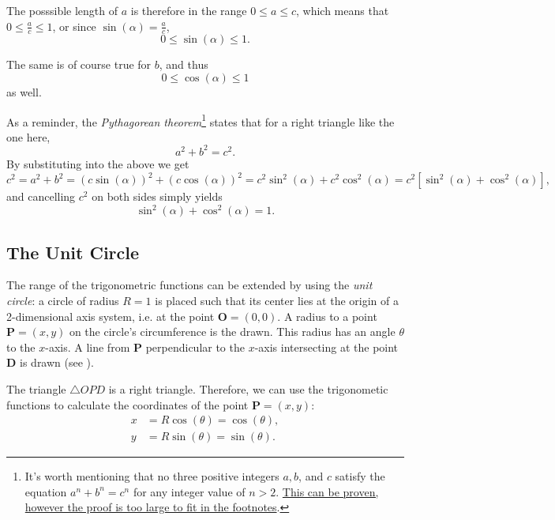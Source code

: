 The posssible length of $a$ is therefore in the range $0\leq a \leq c$, which means that $0\leq \frac{a}{c} \leq 1$, or since $\sin(\alpha)=\frac{a}{c}$,
\begin{equation}
	0\leq \sin(\alpha) \leq1.
	\label{eq:img_sin}
\end{equation}

The same is of course true for $b$, and thus
\begin{equation}
	0\leq \cos(\alpha) \leq1
	\label{eq:img_cos}
\end{equation}
as well.

As a reminder, the \emph{Pythagorean theorem}\footnote{It's worth mentioning that no three positive integers $a, b$, and $c$ satisfy the equation $a^{n}+b^{n}=c^{n}$ for any integer value of $n>2$. \href{https://en.wikipedia.org/wiki/Fermat\%27s_Last_Theorem}{This can be proven, however the proof is too large to fit in the footnotes}.} states that for a right triangle like the one here,
\begin{equation}
	a^{2} + b^{2} = c^{2}.
	\label{eq:pythagorean_theorem}
\end{equation}
By substituting  into the above we get
\begin{equation*}
	c^{2} = a^{2}+b^{2} = \left( c\sin(\alpha) \right)^{2} + \left( c\cos(\alpha) \right)^{2} = c^{2}\sin^{2}(\alpha) + c^{2}\cos^{2}(\alpha) = c^{2}\left[ \sin^{2}(\alpha) + \cos^{2}(\alpha) \right],
\end{equation*}
and cancelling $c^{2}$ on both sides simply yields
\begin{equation}
	\sin^{2}(\alpha) + \cos^{2}(\alpha) = 1.
	\label{eq:sin2_cos2_1}
\end{equation}

\subsection{The Unit Circle}
The range of the trigonometric functions can be extended by using the \emph{unit circle}: a circle of radius $R=1$ is placed such that its center lies at the origin of a 2-dimensional axis system, i.e. at the point $\bm{O}=(0,0)$. A radius to a point $\bm{P}=(x,y)$ on the circle's circumference is the drawn. This radius has an angle $\theta$ to the $x$-axis. A line from $\bm{P}$ perpendicular to the $x$-axis intersecting at the point $\bm{D}$ is drawn (see ).

The triangle $\triangle OPD$ is a right triangle. Therefore, we can use the trigonometic functions to calculate the coordinates of the point $\bm{P}=(x,y)$:
\begin{align}
	x &= R\cos(\theta) = \cos(\theta),\nonumber\\
	y &= R\sin(\theta) = \sin(\theta).
	\label{eq:xy_P}
\end{align}

